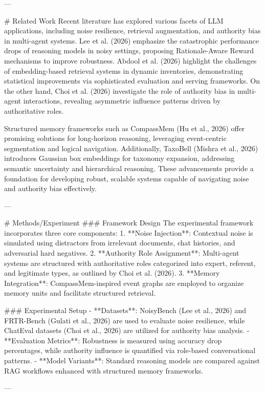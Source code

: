 ---

# Related Work  
Recent literature has explored various facets of LLM applications, including noise resilience, retrieval augmentation, and authority bias in multi-agent systems. Lee et al. (2026) emphasize the catastrophic performance drops of reasoning models in noisy settings, proposing Rationale-Aware Reward mechanisms to improve robustness. Abdool et al. (2026) highlight the challenges of embedding-based retrieval systems in dynamic inventories, demonstrating statistical improvements via sophisticated evaluation and serving frameworks. On the other hand, Choi et al. (2026) investigate the role of authority bias in multi-agent interactions, revealing asymmetric influence patterns driven by authoritative roles.

Structured memory frameworks such as CompassMem (Hu et al., 2026) offer promising solutions for long-horizon reasoning, leveraging event-centric segmentation and logical navigation. Additionally, TaxoBell (Mishra et al., 2026) introduces Gaussian box embeddings for taxonomy expansion, addressing semantic uncertainty and hierarchical reasoning. These advancements provide a foundation for developing robust, scalable systems capable of navigating noise and authority bias effectively.

---

# Methods/Experiment  
### Framework Design  
The experimental framework incorporates three core components:  
1. **Noise Injection**: Contextual noise is simulated using distractors from irrelevant documents, chat histories, and adversarial hard negatives.  
2. **Authority Role Assignment**: Multi-agent systems are structured with authoritative roles categorized into expert, referent, and legitimate types, as outlined by Choi et al. (2026).  
3. **Memory Integration**: CompassMem-inspired event graphs are employed to organize memory units and facilitate structured retrieval.

### Experimental Setup  
- **Datasets**: NoisyBench (Lee et al., 2026) and FRTR-Bench (Gulati et al., 2026) are used to evaluate noise resilience, while ChatEval datasets (Choi et al., 2026) are utilized for authority bias analysis.  
- **Evaluation Metrics**: Robustness is measured using accuracy drop percentages, while authority influence is quantified via role-based conversational patterns.  
- **Model Variants**: Standard reasoning models are compared against RAG workflows enhanced with structured memory frameworks.

---

